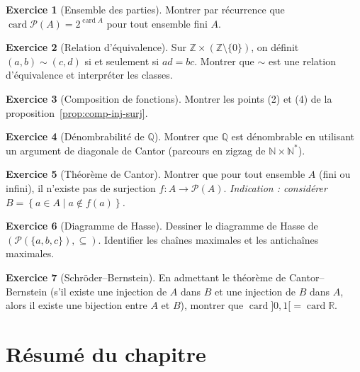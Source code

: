 \documentclass[12pt,a4paper,openany]{book}
\theoremstyle{definition}
\newtheorem{exercice}{Exercice}[chapter]
\theoremstyle{plain}
\theoremstyle{remark}
\newcommand{\N}{\mathbb{N}}
\newcommand{\Z}{\mathbb{Z}}
\newcommand{\Q}{\mathbb{Q}}
\newcommand{\R}{\mathbb{R}}
\newcommand{\set}[1]{\left\{#1\right\}}
\newcommand{\powerset}{\mathcal{P}}
\DeclareMathOperator{\card}{card}
\begin{document}
\begin{exercice}[Ensemble des parties]\label{exo:powerset-cardinal}
Montrer par récurrence que $\card{\powerset(A)} = 2^{\card{A}}$ pour tout
ensemble fini $A$.
\end{exercice}

\begin{exercice}[Relation d'équivalence]\label{exo:equiv-relation}
Sur $\Z \times (\Z \setminus \{0\})$, on définit $(a,b) \sim (c,d)$ si et
seulement si $ad = bc$. Montrer que $\sim$ est une relation d'équivalence et
interpréter les classes.
\end{exercice}

\begin{exercice}[Composition de fonctions]\label{exo:comp-surj}
Montrer les points (2) et (4) de la proposition~\ref{prop:comp-inj-surj}.
\end{exercice}

\begin{exercice}[Dénombrabilité de $\Q$]\label{exo:Q-denombrable}
Montrer que $\Q$ est dénombrable en utilisant un argument de diagonale de
Cantor (parcours en zigzag de $\N \times \N^*$).
\end{exercice}

\begin{exercice}[Théorème de Cantor]\label{exo:cantor-powerset}
Montrer que pour tout ensemble $A$ (fini ou infini), il n'existe pas de
surjection $f \colon A \to \powerset(A)$.
\textit{Indication : considérer $B = \set{a \in A \mid a \notin f(a)}$.}
\end{exercice}

\begin{exercice}[Diagramme de Hasse]\label{exo:hasse}
Dessiner le diagramme de Hasse de $(\powerset(\{a,b,c\}), \subseteq)$.
Identifier les chaînes maximales et les antichaînes maximales.
\end{exercice}

\begin{exercice}[Schröder--Bernstein]\label{exo:schroder-bernstein}
En admettant le théorème de Cantor--Bernstein (s'il existe une injection
de $A$ dans $B$ et une injection de $B$ dans $A$, alors il existe une
bijection entre $A$ et $B$), montrer que $\card{]0,1[} = \card{\R}$.
\end{exercice}

\section*{Résumé du chapitre~\thechapter}\label{sec:resume-ch3}
\end{document}
